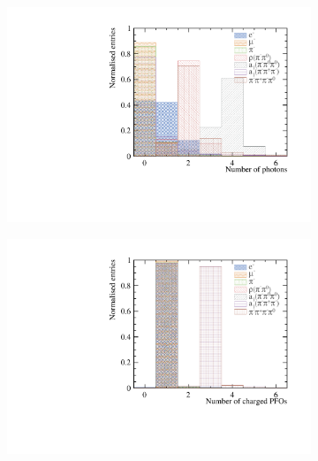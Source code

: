 \documentclass[a4paper,11pt]{article}
\begin{document}
\begin{figure}[!tbp]
\centering %


\begin{subfigure}[b]{0.45\textwidth}
 \includegraphics[width=\textwidth]{plots/var/nPhoton_100GeV_improved} 
  \caption{}
  \label{fig:nPfos}
\end{subfigure}
\hfill
\begin{subfigure}[b]{0.45\textwidth}
 \includegraphics[width=\textwidth]{plots/var/nCharge_100GeV_improved} 
  \caption{}
  \label{fig:nCharge}
\end{subfigure}

\end{figure}
\end{document}
